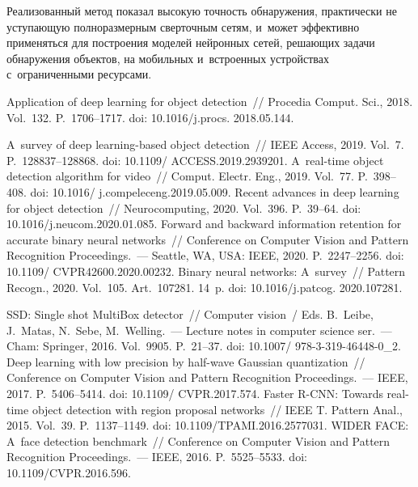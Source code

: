 \begin{multicols}{2}
  Реализованный метод показал высокую точ\-ность обнаружения, практически 
не усту\-па\-ющую пол\-но\-раз\-мер\-ным сверточным сетям, и~может эффективно 
применяться для по\-стро\-ения моделей нейронных сетей, ре\-ша\-ющих задачи 
обнаружения объектов, на мобильных и~встро\-ен\-ных устройствах 
с~ограниченными ре\-сур\-сами.
  
{\small\frenchspacing
 {\baselineskip=10.7pt
 \begin{thebibliography}{99}
 Application of deep learning for object 
detection~// Procedia Comput. Sci., 2018. Vol.~132. P.~1706--1717. doi: 
10.1016/j.procs. 2018.05.144.

 A~survey of deep learning-based 
object detection~// IEEE Access, 2019. Vol.~7. P.~128837--128868. doi: 
10.1109/ \mbox{ACCESS}.2019.2939201.
 A~real-time object detection 
algorithm for video~// Comput. Electr. Eng., 2019. Vol.~77. P.~398--408. doi: 
10.1016/ j.compeleceng.2019.05.009.
 Recent advances in deep learning for object detection~// 
Neurocomputing, 2020. Vol.~396. P.~39--64. doi: 10.1016/j.neucom.2020.01.085.
  Forward and backward 
information retention for accurate binary neural networks~// Conference on Computer 
Vision and Pattern Recognition Proceedings.~--- Seattle, WA, USA: IEEE, 2020. P.~2247--2256. doi: 
10.1109/ CVPR42600.2020.00232.
 Binary neural networks: A~survey~// 
Pattern Recogn., 2020. Vol.~105. Art.~107281. 14~p. doi: 10.1016/j.patcog. 2020.107281.

  SSD: Single 
shot MultiBox detector~// Computer vision~/ Eds. B.~Leibe, J.~Matas, 
N.~Sebe, M.~Welling.~--- Lecture notes in computer science ser.~--- Cham: Springer, 2016. 
Vol.~9905. P.~21--37. doi: 10.1007/ 978-3-319-46448-0\_2.
 Deep learning with low precision by half-wave 
Gaussian quantization~// Conference on Computer Vision and Pattern Recognition Proceedings.~--- IEEE, 
2017. P.~5406--5414. doi: 10.1109/ CVPR.2017.574.
 Faster \mbox{R-CNN}: Towards real-time object detection 
with region proposal networks~// IEEE T. Pattern Anal., 2015. Vol.~39. 
P.~1137--1149. doi: 10.1109/\mbox{TPAMI}.2016.2577031.
 WIDER FACE: A~face detection benchmark~//  
Conference on Computer Vision and Pattern Recognition Proceedings.~--- IEEE, 2016. P.~5525--5533. doi: 
10.1109/CVPR.2016.596.


\end{thebibliography}}}
\end{multicols}
